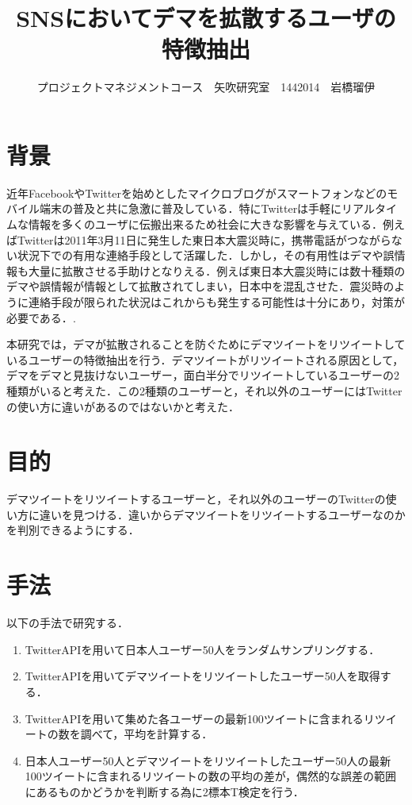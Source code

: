 \documentclass[uplatex,twocolumn,dvipdfmx]{jsarticle}
\title{\vspace{-5mm}\fontsize{14pt}{0pt}\selectfont SNSにおいてデマを拡散するユーザの特徴抽出}
\author{\normalsize プロジェクトマネジメントコース　矢吹研究室　1442014　岩橋瑠伊}
\date{}
\begin{document}
\fontsize{10.5pt}{\baselineskip}\selectfont
\maketitle





\section{背景}
近年FacebookやTwitterを始めとしたマイクロブログがスマートフォンなどのモバイル端末の普及と共に急激に普及している．特にTwitterは手軽にリアルタイムな情報を多くのユーザに伝搬出来るため社会に大きな影響を与えている．例えばTwitterは2011年3月11日に発生した東日本大震災時に，携帯電話がつながらない状況下での有用な連絡手段として活躍した．しかし，その有用性はデマや誤情報も大量に拡散させる手助けとなりえる．例えば東日本大震災時には数十種類のデマや誤情報が情報として拡散されてしまい，日本中を混乱させた．震災時のように連絡手段が限られた状況はこれからも発生する可能性は十分にあり，対策が必要である．\cite{dema}.

本研究では，デマが拡散されることを防ぐためにデマツイートをリツイートしているユーザーの特徴抽出を行う．デマツイートがリツイートされる原因として，デマをデマと見抜けないユーザー，面白半分でリツイートしているユーザーの2種類がいると考えた．この2種類のユーザーと，それ以外のユーザーにはTwitterの使い方に違いがあるのではないかと考えた．

\section{目的}
デマツイートをリツイートするユーザーと，それ以外のユーザーのTwitterの使い方に違いを見つける．違いからデマツイートをリツイートするユーザーなのかを判別できるようにする．

\section{手法}
以下の手法で研究する．
\begin{enumerate}
\item TwitterAPIを用いて日本人ユーザー50人をランダムサンプリングする．
\item TwitterAPIを用いてデマツイートをリツイートしたユーザー50人を取得する．
\item TwitterAPIを用いて集めた各ユーザーの最新100ツイートに含まれるリツイートの数を調べて，平均を計算する．
\item 日本人ユーザー50人とデマツイートをリツイートしたユーザー50人の最新100ツイートに含まれるリツイートの数の平均の差が，偶然的な誤差の範囲にあるものかどうかを判断する為に2標本T検定を行う．
\end{enumerate}
\end{document}
